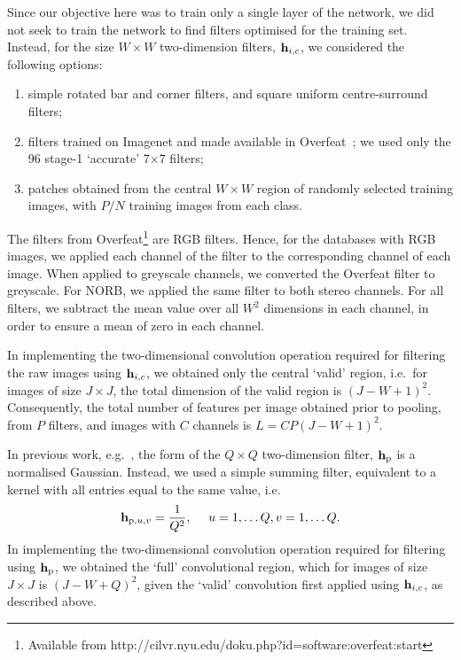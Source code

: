 \documentclass[conference]{IEEEtran}
\begin{document}
Since our objective here was to train only a single layer of the network, we did not seek to train the network to find filters optimised for the training set. Instead, for the size $W\times W$ two-dimension filters, ${\bf h}_{i,c}$, we considered the following options:
\begin{enumerate}
\item simple rotated bar and corner filters, and square uniform centre-surround filters;
\item filters trained on Imagenet and made available in Overfeat~\cite{Sermanet.14_overfeat}; we used only the 96 stage-1 `accurate' 7$\times$7 filters;
\item patches obtained  from the central $W\times W$ region of randomly selected training images, with $P/N$ training images from each class.
\end{enumerate}
The  filters from Overfeat\footnote{Available from http://cilvr.nyu.edu/doku.php?id=software:overfeat:start} are RGB filters. Hence, for the databases with RGB images, we applied each channel of the filter to the corresponding channel of each image. When applied to greyscale channels, we converted the Overfeat filter to greyscale. For NORB, we applied the same filter to both stereo channels. For all filters, we subtract the mean value over all $W^2$ dimensions in each channel, in order to ensure a mean of zero in each channel.

In implementing the two-dimensional convolution operation required for filtering the raw images using ${\bf h}_{i,c}$, we obtained only the central `valid' region, i.e.~for images of size $J\times J$, the total dimension of the valid region is $(J-W+1)^2$. Consequently, the total number of features per image obtained prior to pooling, from $P$ filters, and images with $C$ channels is $L= CP(J-W+1)^2$.


In previous work, e.g.~\cite{Sermanet.12}, the form of the $Q\times Q$ two-dimension filter, ${\bf h}_{\rm p}$ is a normalised Gaussian. Instead, we used a simple summing filter, equivalent to a kernel with all entries equal to the same value, i.e.
\begin{equation}\label{h_pool}
{\bf h}_{{\rm p},u,v}=\frac{1}{Q^2},\quad~u=1,\dots Q, v=1,\dots Q.
\end{equation}
In implementing the two-dimensional convolution operation required for filtering using ${\bf h}_{{\rm p}}$, we obtained the `full' convolutional region, which for images of size $J\times J$ is $(J-W+Q)^2$, given the `valid' convolution first applied using ${\bf h}_{i,c}$, as described above.
\end{document}
